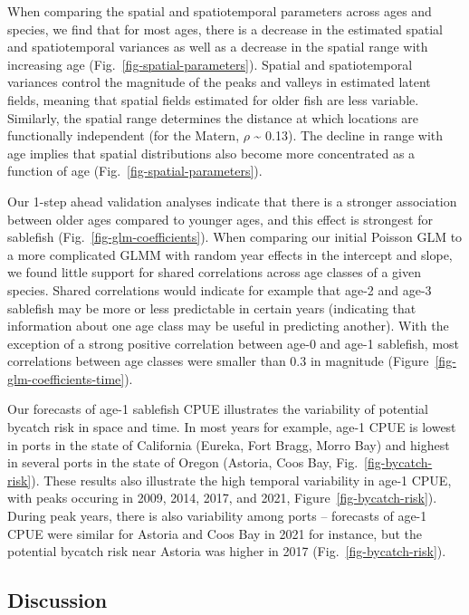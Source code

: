 \documentclass[
]{article}
\begin{document}
When comparing the spatial and spatiotemporal parameters across ages and
species, we find that for most ages, there is a decrease in the
estimated spatial and spatiotemporal variances as well as a decrease in
the spatial range with increasing age
(Fig.~\ref{fig-spatial-parameters}). Spatial and spatiotemporal
variances control the magnitude of the peaks and valleys in estimated
latent fields, meaning that spatial fields estimated for older fish are
less variable. Similarly, the spatial range determines the distance at
which locations are functionally independent (for the Matern, \(\rho\)
\textasciitilde{} 0.13). The decline in range with age implies that
spatial distributions also become more concentrated as a function of age
(Fig.~\ref{fig-spatial-parameters}).

Our 1-step ahead validation analyses indicate that there is a stronger
association between older ages compared to younger ages, and this effect
is strongest for sablefish (Fig.~\ref{fig-glm-coefficients}). When
comparing our initial Poisson GLM to a more complicated GLMM with random
year effects in the intercept and slope, we found little support for
shared correlations across age classes of a given species. Shared
correlations would indicate for example that age-2 and age-3 sablefish
may be more or less predictable in certain years (indicating that
information about one age class may be useful in predicting another).
With the exception of a strong positive correlation between age-0 and
age-1 sablefish, most correlations between age classes were smaller than
0.3 in magnitude (Figure~\ref{fig-glm-coefficients-time}).

Our forecasts of age-1 sablefish CPUE illustrates the variability of
potential bycatch risk in space and time. In most years for example,
age-1 CPUE is lowest in ports in the state of California (Eureka, Fort
Bragg, Morro Bay) and highest in several ports in the state of Oregon
(Astoria, Coos Bay, Fig.~\ref{fig-bycatch-risk}). These results also
illustrate the high temporal variability in age-1 CPUE, with peaks
occuring in 2009, 2014, 2017, and 2021, Figure~\ref{fig-bycatch-risk}).
During peak years, there is also variability among ports -- forecasts of
age-1 CPUE were similar for Astoria and Coos Bay in 2021 for instance,
but the potential bycatch risk near Astoria was higher in 2017
(Fig.~\ref{fig-bycatch-risk}).

\subsection{Discussion}\label{discussion}
\end{document}
